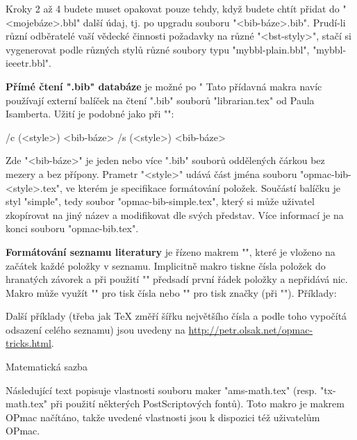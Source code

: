 Kroky 2 až 4 budete muset opakovat pouze tehdy, když budete chtít přidat do
"<mojebáze>.bbl" další údaj, tj. po upgradu souboru "<bib-báze>.bib". 
Prudí-li různí odběratelé vaší vědecké činnosti požadavky na různé 
"<bst-styly>", stačí si vygenerovat
podle různých stylů různé soubory typu "mybbl-plain.bbl",
"mybbl-ieeetr.bbl".

\medskip
\noindent
{\bf Přímé čtení ".bib" databáze} je možné po "
Tato přídavná makra navíc používají externí balíček na čtení ".bib" souborů 
"librarian.tex" od Paula Isamberta. Užití je podobné jako při "\usebbl":

\begtt
\usebib/c (<style>) <bib-báze> %
\usebib/s (<style>) <bib-báze> %
\endtt

Zde "<bib-báze>" je jeden nebo více ".bib" souborů oddělených čárkou bez
mezery a bez přípony. Prametr "<style>" udává část jména souboru
"opmac-bib-<style>.tex", ve kterém je specifikace formátování položek.
Součástí balíčku je styl "simple", tedy soubor "opmac-bib-simple.tex",
který si může uživatel zkopírovat na jiný název a modifikovat dle svých
představ. Více informací je na konci souboru "opmac-bib.tex".

\medskip
\noindent 
{\bf Formátování seznamu literatury} je řízeno makrem "\printbib",
které je vloženo na začátek každé položky v seznamu. 
Implicitně makro tiskne čísla položek do
hranatých závorek a při použití "\nonumcitations" předsadí první řádek
položky a nepřidává nic. Makro může využít "\the\bibnum" pro tisk 
čísla nebo "\the\bibmark" pro tisk značky (při "\nonumcitations").
Příklady:

\begtt
\def\printbib{\hangindent=\parindent \indent \llap{\the\bibnum. }}

\def\printbib{\hangindent=\parindent \noindent [\the\bibmark]\quad}
\endtt

Další příklady (třeba jak \TeX{} změří šířku největšího čísla a podle toho
vypočítá odsazení celého seznamu) jsou uvedeny na
\url{http://petr.olsak.net/opmac-tricks.html}.

\sec Matematická sazba

Následující text popisuje vlastnosti souboru maker "ams-math.tex" (resp.
"tx-math.tex" při použití některých PostScriptových fontů). Toto makro je
makrem OPmac načítáno, takže uvedené vlastnosti jsou k dispozici též
uživatelům OPmac.

